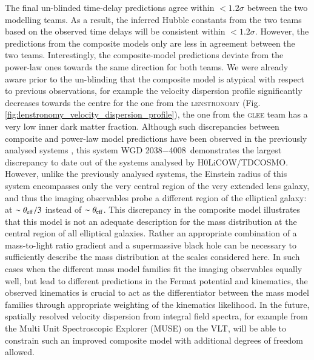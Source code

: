 \documentclass[longauth]{aa}
\newcommand{\lensname}{WGD 2038$-$4008}
\newcommand{\ajsiii}[1]{{{#1}}}
\newcommand{\kw}[1]{{{#1}}}
\newcommand{\lreply}[1]{{{#1}}}
\begin{document}
{The final un-blinded time-delay predictions agree within $<1.2\sigma$ between the two modelling teams. As a result, the inferred Hubble constants from the two teams based on the observed time delays will be consistent within $<1.2\sigma$.} However, the predictions from the composite models only are less in agreement between the two teams. Interestingly, the composite-model predictions deviate from the power-law ones towards the same direction for both teams. We were already aware prior to the un-blinding that the composite model is \ajsiii{atypical with respect to previous observations}, for example the velocity dispersion profile significantly decreases towards the centre for the one from the \textsc{lenstronomy} (Fig. \ref{fig:lenstronomy_velocity_dispersion_profile}), \ajsiii{the one from the \textsc{glee} team has a very low inner dark matter fraction.} %
Although such discrepancies between composite and power-law model predictions have been observed in the previously analysed systems \citep[e.g.][]{Suyu14}, this system \lensname\ demonstrates the largest discrepancy to date out of the systems analysed by H0LiCOW/TDCOSMO. However, unlike the previously analysed systems, the Einstein radius of this system encompasses only the very central region of the very extended lens galaxy, and thus the imaging observables probe a different region of the elliptical galaxy: at $ \sim \theta_{\rm eff}/3$ instead of $\sim \theta_{\rm eff}$. This discrepancy  in the composite model illustrates that this model is not an adequate description for the mass distribution at the central region of {all} elliptical galaxies. Rather an appropriate combination of a mass-to-light ratio gradient and a supermassive black hole can be necessary to sufficiently describe the mass distribution at the scales considered here. In such cases when the different mass model families fit the imaging observables equally well, but lead to different predictions in the Fermat potential and kinematics, the observed kinematics is crucial to act as the differentiator between the mass model families through appropriate weighting of the kinematics likelihood. In the future, spatially resolved velocity dispersion from integral field spectra\lreply{, for example from the Multi Unit Spectroscopic Explorer (MUSE) on the VLT,} will be able to constrain such an improved composite model with additional degrees of freedom allowed. 
\end{document}
